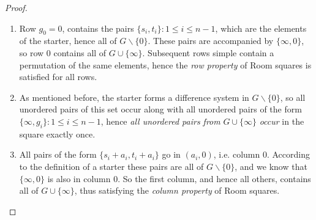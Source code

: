 \begin{proof}
\begin{enumerate}
  \item{Row $g_0 = 0$, contains the pairs
      $\{s_i, t_i\}:1 \leq i \leq n-1$,
      which are the elements of the starter,
      hence all of $G \backslash \{0\}$. These pairs are
      accompanied by $\{\infty, 0\}$, so row 0 contains all
      of $G \cup \{\infty\}$. Subsequent rows simple
      contain a permutation of the same elements, hence
      the \emph{row property} of Room squares is satisfied for
      all rows.}
  \item{As mentioned before, the starter forms a difference
      system in $G \backslash \{0\}$, so all unordered
      pairs of this set occur along with all unordered
      pairs of the form
      $\{\infty, g_i\}: 1 \leq i \leq n - 1$,
      hence \emph{all unordered pairs from}
      $G \cup \{\infty\}$ \emph{occur} in the square exactly once.}
  \item{All pairs of the form $\{s_i + a_i, t_i + a_i\}$ go in
      $(a_i, 0)$, i.e. column 0. According to the
      definition of a starter these pairs are all of $G
      \backslash \{0\}$, and we know that $\{\infty,0\}$
      is also in column 0. So the first column, and hence
      all others, contains all of $G \cup \{\infty\}$,
      thus satisfying the \emph{column property} of Room
      squares.}
\end{enumerate}
\end{proof}
